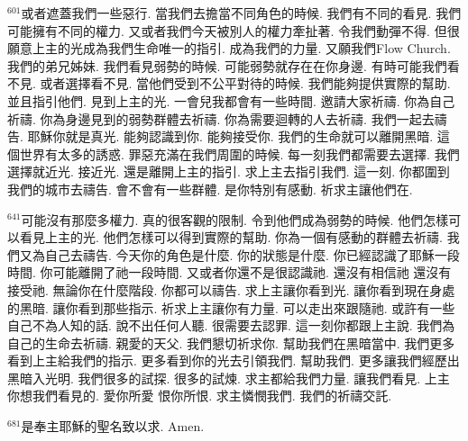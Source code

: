 \documentclass{book}
\begin{document}
$^{601}$或者遮蓋我們一些惡行.
當我們去擔當不同角色的時候.
我們有不同的看見.
我們可能擁有不同的權力.
又或者我們今天被別人的權力牽扯著.
令我們動彈不得.
但很願意上主的光成為我們生命唯一的指引.
成為我們的力量.
又願我們Flow Church.
我們的弟兄姊妹.
我們看見弱勢的時候.
可能弱勢就存在在你身邊.
有時可能我們看不見.
或者選擇看不見.
當他們受到不公平對待的時候.
我們能夠提供實際的幫助.
並且指引他們.
見到上主的光.
一會兒我都會有一些時間.
邀請大家祈禱.
你為自己祈禱.
你為身邊見到的弱勢群體去祈禱.
你為需要迴轉的人去祈禱.
我們一起去禱告.
耶穌你就是真光.
能夠認識到你.
能夠接受你.
我們的生命就可以離開黑暗.
這個世界有太多的誘惑.
罪惡充滿在我們周圍的時候.
每一刻我們都需要去選擇.
我們選擇就近光.
接近光.
還是離開上主的指引.
求上主去指引我們.
這一刻.
你都圍到我們的城市去禱告.
會不會有一些群體.
是你特別有感動.
祈求主讓他們在.

$^{641}$可能沒有那麼多權力.
真的很客觀的限制.
令到他們成為弱勢的時候.
他們怎樣可以看見上主的光.
他們怎樣可以得到實際的幫助.
你為一個有感動的群體去祈禱.
我們又為自己去禱告.
今天你的角色是什麼.
你的狀態是什麼.
你已經認識了耶穌一段時間.
你可能離開了祂一段時間.
又或者你還不是很認識祂.
還沒有相信祂 還沒有接受祂.
無論你在什麼階段.
你都可以禱告.
求上主讓你看到光.
讓你看到現在身處的黑暗.
讓你看到那些指示.
祈求上主讓你有力量.
可以走出來跟隨祂.
或許有一些自己不為人知的話.
說不出任何人聽.
很需要去認罪.
這一刻你都跟上主說.
我們為自己的生命去祈禱.
親愛的天父.
我們懇切祈求你.
幫助我們在黑暗當中.
我們更多看到上主給我們的指示.
更多看到你的光去引領我們.
幫助我們.
更多讓我們經歷出黑暗入光明.
我們很多的試探.
很多的試煉.
求主都給我們力量.
讓我們看見.
上主你想我們看見的.
愛你所愛 恨你所恨.
求主憐憫我們.
我們的祈禱交託.

$^{681}$是奉主耶穌的聖名致以求.
Amen.
\newpage
\end{document}
